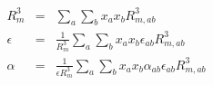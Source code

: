 \pagestyle{empty}


\begin{eqnarray*}
   R_{m}^{3} &=& \displaystyle\sum_{a}\displaystyle\sum_{b} x_{a}x_{b}R_{m,ab}^{3} \\
   \epsilon  &=& \frac{1}{R_{m}^{3}}\displaystyle\sum_{a}\displaystyle\sum_{b} x_{a}x_{b}\epsilon_{ab}R_{m,ab}^{3} \\
   \alpha    &=& \frac{1}{\epsilon R_{m}^{3}}\displaystyle\sum_{a}\displaystyle\sum_{b} x_{a}x_{b}\alpha_{ab}\epsilon_{ab}R_{m,ab}^{3} \\
\end{eqnarray*}                           


